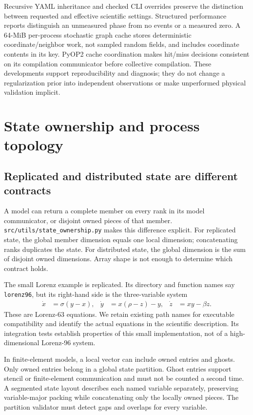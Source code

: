 \documentclass[11pt,a4paper]{article}
\newcommand{\code}[1]{\nolinkurl{#1}}
\begin{document}
Recursive YAML inheritance and checked CLI overrides preserve the distinction between requested and effective scientific settings. Structured performance reports distinguish an unmeasured phase from no events or a measured zero. A 64-MiB per-process stochastic graph cache stores deterministic coordinate/neighbor work, not sampled random fields, and includes coordinate contents in its key. PyOP2 cache coordination makes hit/miss decisions consistent on its compilation communicator before collective compilation. These developments support reproducibility and diagnosis; they do not change a regularization prior into independent observations or make unperformed physical validation implicit.

\section{State ownership and process topology}
\subsection{Replicated and distributed state are different contracts}
A model can return a complete member on every rank in its model communicator, or disjoint owned pieces of that member. \code{src/utils/state_ownership.py} makes this difference explicit. For replicated state, the global member dimension equals one local dimension; concatenating ranks duplicates the state. For distributed state, the global dimension is the sum of disjoint owned dimensions. Array shape is not enough to determine which contract holds.

The small Lorenz example is replicated. Its directory and function names say \code{lorenz96}, but its right-hand side is the three-variable system
\begin{align}
 \dot x&=\sigma(y-x),&\dot y&=x(\rho-z)-y,&\dot z&=xy-\beta z.
\end{align}
These are Lorenz-63 equations. We retain existing path names for executable compatibility and identify the actual equations in the scientific description. Its integration tests establish properties of this small implementation, not of a high-dimensional Lorenz-96 system.

In finite-element models, a local vector can include owned entries and ghosts. Only owned entries belong in a global state partition. Ghost entries support stencil or finite-element communication and must not be counted a second time. A segmented state layout describes each named variable separately, preserving variable-major packing while concatenating only the locally owned pieces. The partition validator must detect gaps and overlaps for every variable.
\end{document}
